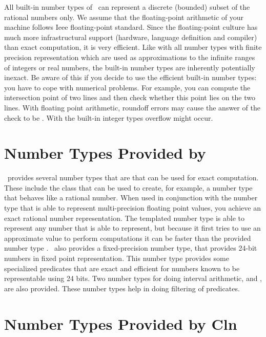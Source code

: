 All built-in number types of \CC\ can represent a discrete (bounded)
subset of the rational numbers only.  We assume that the
floating-point arithmetic of your machine follows {\sc Ieee}
floating-point standard.  Since the floating-point culture has much
more infrastructural support (hardware, language definition and
compiler) than exact computation, it is very efficient.
Like with all number types with finite precision representation
which are used as approximations to the infinite ranges of 
integers or real numbers, the built-in number types are inherently
potentially inexact.
Be aware of this if you decide to use the efficient built-in 
number types: you have to cope with numerical problems.  
For example, you can compute the intersection point of two lines and 
then check whether this point lies on the two lines. 
With floating point arithmetic,
roundoff errors may cause the answer of the check to be . 
With the built-in integer types overflow might occur.

\section{Number Types Provided by \cgal}

\cgal\ provides several number types that are that can be used for 
exact computation.  These include the  class that can
be used to create, for example, a number type that behaves like a rational
number.  When used in conjunction with the number type  that
is able to represent multi-precision floating point values, you achieve
an exact rational number representation.  The templated number type
 is able to represent any number that  is able
to represent, but because it first tries to use an approximate value to
perform computations it can be faster than the provided number type .
\cgal\ also provides a fixed-precision number type,
 that provides 24-bit numbers in fixed point
representation.  This number type provides some specialized predicates
that are exact and efficient for numbers known to be representable using
24 bits.
Two number types for doing interval arithmetic,  and
, are also provided.  These number types
help in doing filtering of predicates.

\section{Number Types Provided by {\sc Cln}}
\label{CLN}

